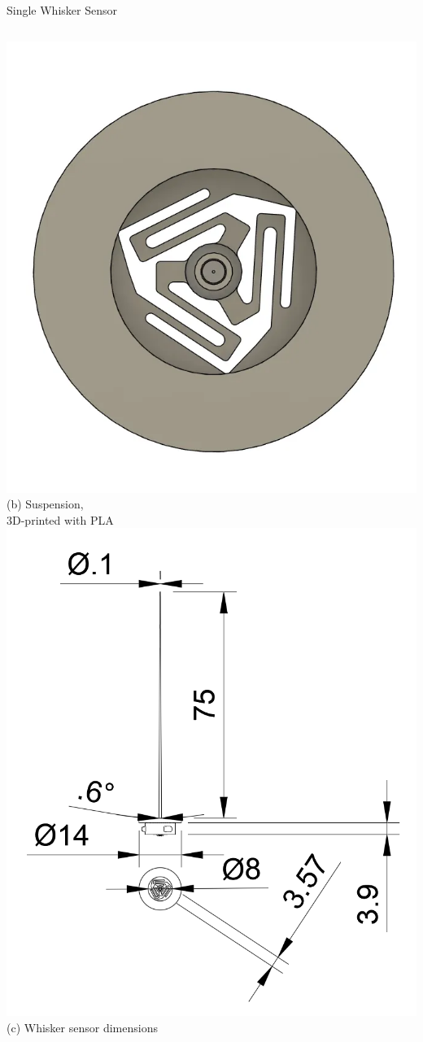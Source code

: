 \documentclass[AIRbeamer
               ,optEnglish
               ,optBiber
               ,optBibstyleAlphabetic
               ,optBeamerClassicFormat%
               ]{AIRlatex}
\begin{document}
\begin{frame}[c]{Single Whisker Sensor}
\begin{columns}[c,onlytextwidth]
    \includegraphics[height=0.6\textheight]{figures/suspension}\\
    (b) Suspension,\\3D-printed with PLA
    \centering
    \includegraphics[height=0.6\textheight]{figures/whisker-dims}\\
    (c) Whisker sensor dimensions
\end{columns}
\end{frame}
\end{document}
